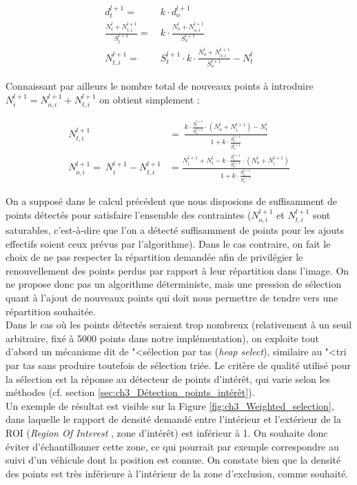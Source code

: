 \begin{align}
	d_t^{l+1} =& \: k \cdot d_o^{l+1} \\
	\frac{N_t^l + N_{t,i}^{l+1} }{S_t^{l+1}} =& \: k \cdot \frac{N_o^l + N_{o,i}^{l+1} }{S_o^{l+1}} \\
	N_{t,i}^{l+1} =& \: S_t^{l+1} \cdot k \cdot \frac{N_o^l + N_{o,i}^{l+1} }{S_o^{l+1}} - N_t^l 
\end{align}

Connaissant par ailleurs le nombre total de nouveaux points à introduire $N_i^{l+1} = N_{o,i}^{l+1} + N_{t,i}^{l+1}$ on obtient simplement :

\begin{align}
	N_{t,i}^{l+1} &= \:\frac{k \cdot \frac{S_t^{l+1}}{S_o^{l+1}} \cdot (N_o^l + N_i^{l+1}) - N_t^l}  {1 + k \cdot \frac{S_t^{l+1}}{S_o^{l+1}}} \\
	N_{o,i}^{l+1} = \: N_i^{l+1} - N_{t,i}^{l+1} &= \frac{ N_i^{l+1} + N_t^l - k \cdot \frac{S_t^{l+1}}{S_o^{l+1}} \cdot (N_o^l + N_i^{l+1})}  {1 + k \cdot \frac{S_t^{l+1}}{S_o^{l+1}}}
\end{align}

On a supposé dans le calcul précédent que nous disposions de suffisamment de points détectés pour satisfaire l'ensemble des contraintes ($N_{o,i}^{l+1}$ et $N_{t,i}^{l+1}$ sont saturables, c'est-à-dire que l'on a détecté suffisamment de points pour les ajouts effectifs soient ceux prévus par l'algorithme). Dans le cas contraire, on fait le choix de ne pas respecter la répartition demandée afin de privilégier le renouvellement des points perdus par rapport à leur répartition dans l'image. On ne propose donc pas un algorithme déterministe, mais une \og pression de sélection\fg{} quant à l'ajout de nouveaux points qui doit nous permettre de tendre vers une répartition souhaitée. \\

Dans le cas où les points détectés seraient trop nombreux (relativement à un seuil arbitraire, fixé à 5000 points dans notre implémentation), on exploite tout d'abord un mécanisme dit de "<sélection par tas\fg{} (\emph{heap select}), similaire au "<tri par tas\fg{} sans produire toutefois de sélection triée. Le critère de qualité utilisé pour la sélection est la réponse au détecteur de points d'intérêt, qui varie selon les méthodes (cf. section \ref{sec:ch3_Détection_points_intérêt}).\\

Un exemple de résultat est visible sur la Figure \ref{fig:ch3_Weighted_selection}, dans laquelle le rapport de densité demandé entre l'intérieur et l'extérieur de la ROI (\emph{Region Of Interest }, zone d'intérêt) est inférieur à 1. On souhaite donc éviter d'échantillonner cette zone, ce qui pourrait par exemple correspondre au suivi d'un véhicule dont la position est connue. On constate bien que la densité des points est très inférieure à l'intérieur de la zone d'exclusion, comme souhaité. \\

